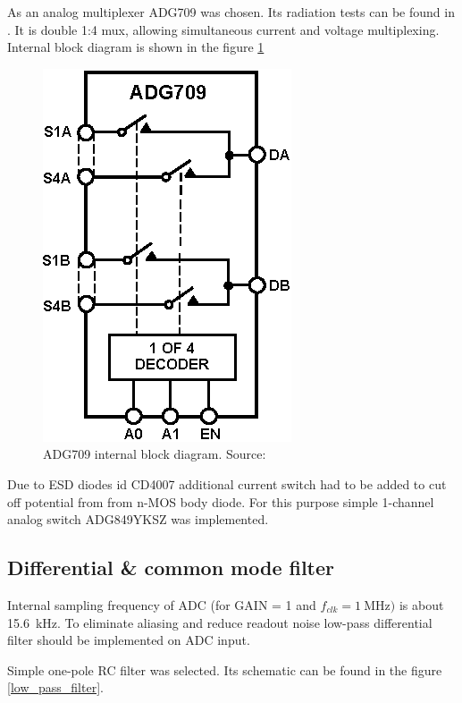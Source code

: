         As an analog multiplexer ADG709 was chosen. Its radiation tests can be found in \cite{IEEE_radiation_tests_1992_2009}. It is double 1:4 mux, allowing simultaneous current and voltage multiplexing. Internal block diagram is shown in the figure \ref{ADG709_block}

        \begin{figure}[H]
            \centering
            \includegraphics[width=0.3\paperwidth]{img/06/ADG709.eps}
            \caption{ADG709 internal block diagram. Source: \cite{ADG709_datasheet}}
            \label{ADG709_block}
        \end{figure}

        Due to ESD diodes id CD4007 additional current switch had to be added to cut off potential from from n-MOS body diode. For this purpose simple 1-channel analog switch ADG849YKSZ was implemented.

    \subsection{Differential \& common mode filter}
        Internal sampling frequency of ADC (for GAIN = 1 and $f_{clk} = \SI{1}{\mega\hertz})$ is about \SI{15.6}{\kilo\hertz}. To eliminate aliasing and reduce readout noise low-pass differential filter should be implemented on ADC input.

        Simple one-pole RC filter was selected. Its schematic can be found in the figure \ref{low_pass_filter}.

